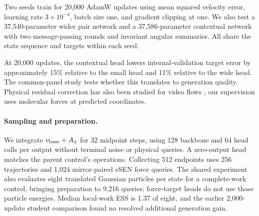 Two seeds train for 20,000 AdamW updates using mean squared velocity error, learning rate $3\times10^{-4}$, batch size one, and gradient clipping at one. We also test a 37,540-parameter wider pair network and a 37,586-parameter contextual network with two message-passing rounds and invariant angular summaries. All share the state sequence and targets within each seed.

At 20,000 updates, the contextual head lowers internal-validation target error by approximately 15\% relative to the small head and 11\% relative to the wide head. The common-panel study tests whether this translates to generation quality. Physical residual correction has also been studied for video flows \citep{wang2026pila}; our supervision uses molecular forces at predicted coordinates.

\paragraph{Sampling and preparation.}
We integrate $v_{\rm base}+A_\phi$ for 32 midpoint steps, using 128 backbone and 64 head calls per output without terminal noise or physical queries. A zero-output head matches the parent control's operations. Collecting 512 endpoints uses 256 trajectories and 1,024 mirror-paired eSEN force queries. The shared experiment also evaluates eight translated Gaussian particles per state for a complete-work control, bringing preparation to 9,216 queries; force-target heads do not use those particle energies. Median local-work ESS is 1.37 of eight, and the earlier 2,000-update student comparison found no resolved additional generation gain.
